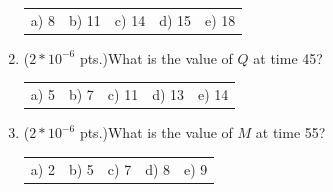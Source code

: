 \documentclass{article}
\begin{document}
\begin{enumerate}
\begin{tabular}{p{0.6in} p{0.6in} p{0.6in} p{0.6in} l}
a) 8  & b) 11  & c) 14 & d) 15  & e) 18
\end{tabular}

\item {($2*10^{-6}$ pts.)}What is the value of $Q$ at time 45?

\begin{tabular}{p{0.6in} p{0.6in} p{0.6in} p{0.6in} l}
a) 5  & b) 7  & c) 11 & d) 13  & e) 14
\end{tabular}

\item {($2*10^{-6}$ pts.)}What is the value of $M$ at time 55?

\begin{tabular}{p{0.6in} p{0.6in} p{0.6in} p{0.6in} l}
a) 2  & b) 5  & c) 7 & d) 8  & e) 9
\end{tabular}
\end{enumerate}
\end{document}
